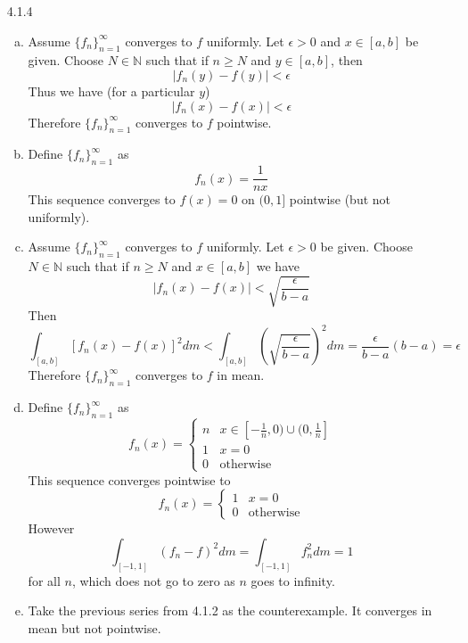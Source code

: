 \documentclass[../../Solutions.tex]{subfiles}
\begin{document}
\begin{itemize}
	\item [4.1.4]
	\begin{enumerate}[(a)]
		\item Assume $\{f_n\}_{n=1}^\infty$ converges to $f$ uniformly.
			Let $\epsilon > 0$ and $x \in [a,b]$ be given.
			Choose $N \in \mathbb{N}$ such that if $n \geq N$ and $y \in [a,b]$, then
			$$ |f_n(y)-f(y)| < \epsilon $$
			Thus we have (for a particular $y$)
			$$ |f_n(x)-f(x)| < \epsilon $$
			Therefore $\{f_n\}_{n=1}^\infty$ converges to $f$ pointwise.
		\item Define $\{f_n\}_{n=1}^\infty$ as
			$$ f_n(x) = \frac{1}{nx} $$
			This sequence converges to $f(x) = 0$ on $(0,1]$ pointwise (but not uniformly).
		\item Assume $\{f_n\}_{n=1}^\infty$ converges to $f$ uniformly.
			Let $\epsilon > 0$ be given.
			Choose $N \in \mathbb{N}$ such that if $n \geq N$ and $x \in [a,b]$ we have
			$$ |f_n(x)-f(x)| < \sqrt{\frac{\epsilon}{b-a}} $$
			Then
			$$ \int_{[a,b]} [f_n(x)-f(x)]^2 dm < \int_{[a,b]} \left(\sqrt{\frac{\epsilon}{b-a}}\right)^2 dm = \frac{\epsilon}{b-a}(b-a) = \epsilon $$
			Therefore $\{f_n\}_{n=1}^\infty$ converges to $f$ in mean.
		\item Define $\{f_n\}_{n=1}^\infty$ as
			\begin{equation*}
				f_n(x) = \begin{cases}
					n & x \in [-\frac{1}{n},0)\cup(0,\frac{1}{n}] \\
					1 & x = 0 \\
					0 & \text{otherwise}
				\end{cases}
			\end{equation*}
			This sequence converges pointwise to
			\begin{equation*}
				f_n(x) = \begin{cases}
					1 & x = 0 \\
					0 & \text{otherwise}
				\end{cases}
			\end{equation*}
			However
			\begin{equation*}
				\int_{[-1,1]} (f_n-f)^2 dm = \int_{[-1,1]} f_n^2 dm = 1
			\end{equation*}
			for all $n$, which does not go to zero as $n$ goes to infinity.
		\item Take the previous series from 4.1.2 as the counterexample.
			It converges in mean but not pointwise.
	\end{enumerate}
	

\end{itemize}
\end{document}
